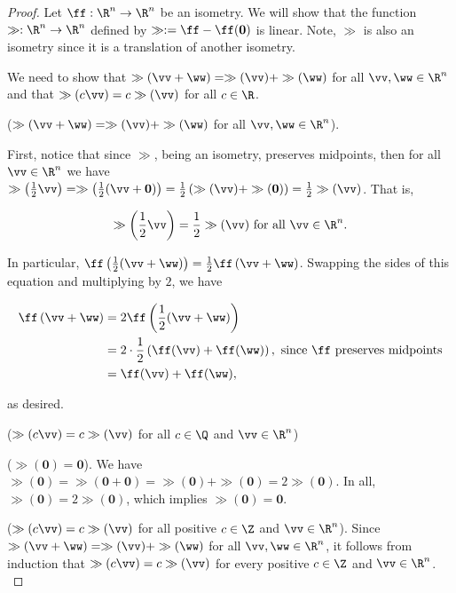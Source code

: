 \begin{proof}
	Let $\ff:\R^n \rightarrow \R^n$ be an isometry. We will show that the function $\gg:\R^n \rightarrow \R^n$ defined by $\gg := \ff - \ff(\mathbf{0})$ is linear. Note, $\gg$ is also an isometry since it is a translation of another isometry.
	
	We need to show that $\gg(\vv + \ww) = \gg(\vv) + \gg(\ww)$ for all $\vv, \ww \in \R^n$ and that $\gg(c\vv) = c\gg(\vv)$ for all $c \in \R$.
	
	\vspace{.5cm}
	
	($\gg(\vv + \ww) = \gg(\vv) + \gg(\ww)$ for all $\vv, \ww \in \R^n$).
	\fullindent
	{
		First, notice that since $\gg$, being an isometry, preserves midpoints, then for all $\vv \in \R^n$ we have $\gg\left(\frac{1}{2}\vv \right) = \gg\left(\frac{1}{2}(\vv + \mathbf{0})\right) = \frac{1}{2}\left(\gg(\vv) + \gg(\mathbf{0})\right) = \frac{1}{2}\gg(\vv)$. That is, 
		
		\begin{align*}
			\gg\left(\frac{1}{2}\vv\right) = \frac{1}{2}\gg(\vv) \text{ for all $\vv \in \R^n$}.
		\end{align*}
		
		In particular, $\ff\left(\frac{1}{2}(\vv + \ww)\right) = \frac{1}{2}\ff\left(\vv + \ww\right)$. Swapping the sides of this equation and multiplying by $2$, we have
		
		\begin{align*}
			\ff\left(\vv + \ww\right) &= 2\ff\left(\frac{1}{2}(\vv + \ww)\right) \\
			&= 2 \cdot \frac{1}{2}\left(\ff(\vv) + \ff(\ww)\right), \text{ since $\ff$ preserves midpoints} \\
			&= \ff(\vv) + \ff(\ww),
		\end{align*}
		
		as desired.
	}
	
	\vspace{.5cm}
	
	($\gg(c\vv) = c\gg(\vv)$ for all $c \in \Q$ and $\vv \in \R^n$)
	\fullindent
	{
		($\gg(\mathbf{0}) = \mathbf{0}$).
		\fullindent
		{
			We have $\gg(\mathbf{0}) = \gg(\mathbf{0} + \mathbf{0}) = \gg(\mathbf{0}) + \gg(\mathbf{0}) = 2\gg(\mathbf{0})$. In all, $\gg(\mathbf{0}) = 2\gg(\mathbf{0})$, which implies $\gg(\mathbf{0}) = \mathbf{0}$.
		}
		
		\vspace{.25cm}
		
		($\gg(c\vv) = c\gg(\vv)$ for all positive $c \in \Z$ and $\vv \in \R^n$).
		\fullindent
		{
			Since $\gg(\vv + \ww) = \gg(\vv) + \gg(\ww)$ for all $\vv, \ww \in \R^n$, it follows from induction that $\gg(c\vv) = c\gg(\vv)$ for every positive $c \in \Z$ and $\vv \in \R^n$.
		}
		
}
\end{proof}
